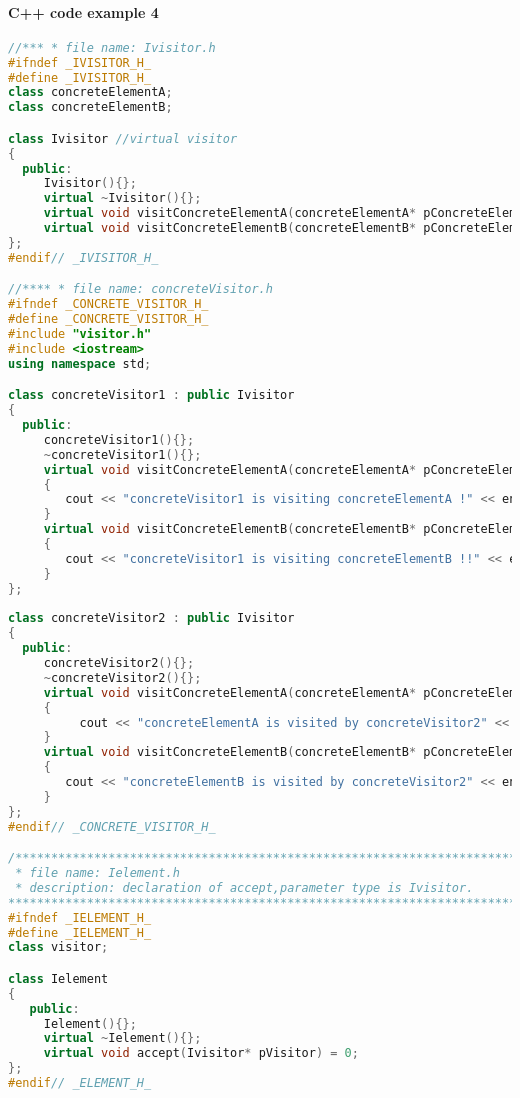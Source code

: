 \documentclass{book}
\begin{document}
\paragraph{C++ code example 4}\mbox{}

\begin{lstlisting}[caption={visitor pattern sample code 4, Ivisitor},label={lst:vps4},language=C++]
//*** * file name: Ivisitor.h
#ifndef _IVISITOR_H_ 
#define _IVISITOR_H_ 
class concreteElementA; 
class concreteElementB; 

class Ivisitor //virtual visitor
{ 
  public: 
     Ivisitor(){}; 
     virtual ~Ivisitor(){}; 
     virtual void visitConcreteElementA(concreteElementA* pConcreteElementA) = 0; 
     virtual void visitConcreteElementB(concreteElementB* pConcreteElementB) = 0; 
}; 
#endif// _IVISITOR_H_ 

//**** * file name: concreteVisitor.h
#ifndef _CONCRETE_VISITOR_H_ 
#define _CONCRETE_VISITOR_H_ 
#include "visitor.h" 
#include <iostream> 
using namespace std; 

class concreteVisitor1 : public Ivisitor 
{ 
  public: 
     concreteVisitor1(){}; 
     ~concreteVisitor1(){}; 
     virtual void visitConcreteElementA(concreteElementA* pConcreteElementA) 
     { 
        cout << "concreteVisitor1 is visiting concreteElementA !" << endl;  
     } 
     virtual void visitConcreteElementB(concreteElementB* pConcreteElementB) 
     { 
        cout << "concreteVisitor1 is visiting concreteElementB !!" << endl;   
     } 
}; 
 
class concreteVisitor2 : public Ivisitor 
{ 
  public: 
     concreteVisitor2(){}; 
     ~concreteVisitor2(){}; 
     virtual void visitConcreteElementA(concreteElementA* pConcreteElementA) 
     { 
          cout << "concreteElementA is visited by concreteVisitor2" << endl;  
     } 
     virtual void visitConcreteElementB(concreteElementB* pConcreteElementB) 
     { 
        cout << "concreteElementB is visited by concreteVisitor2" << endl;   
     } 
}; 
#endif// _CONCRETE_VISITOR_H_ 

/************************************************************************ 
 * file name: Ielement.h
 * description: declaration of accept,parameter type is Ivisitor.
************************************************************************/ 
#ifndef _IELEMENT_H_ 
#define _IELEMENT_H_ 
class visitor; 

class Ielement 
{ 
   public: 
     Ielement(){}; 
     virtual ~Ielement(){}; 
     virtual void accept(Ivisitor* pVisitor) = 0; 
}; 
#endif// _ELEMENT_H_ 


\end{lstlisting}
\end{document}
